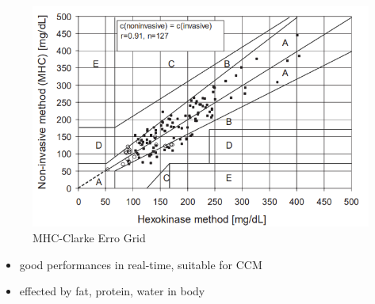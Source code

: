 \documentclass[fontsize=11pt,aspectratio=169,t,fleqn]{beamer}
\begin{document}
\begin{frame}
\begin{figure}[!htb]
          \includegraphics[width=\linewidth]{fig/MHC_ceg.png}
          \caption{MHC-Clarke Erro Grid}
        \endminipage
    \end{figure}
    \begin{itemize}
        \item good performances in real-time, suitable for CCM
        \item effected by fat, protein, water in body
    \end{itemize}
\end{frame}
\end{document}

